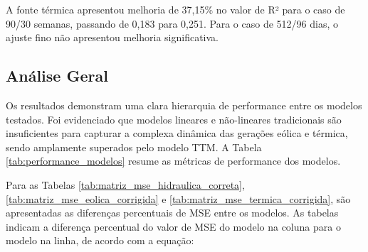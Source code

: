 A fonte térmica apresentou melhoria de 37,15\% no valor de R² para o caso de 90/30 semanas, passando de 0,183 para 0,251.
Para o caso de 512/96 dias, o ajuste fino não apresentou melhoria significativa. 

\subsection{Análise Geral}
Os resultados demonstram uma clara hierarquia de performance entre os modelos testados. Foi evidenciado que modelos 
lineares e não-lineares tradicionais são insuficientes para capturar a complexa dinâmica das gerações eólica e térmica, sendo 
amplamente superados pelo modelo TTM. A Tabela \ref{tab:performance_modelos} resume as métricas de performance dos modelos.

\begin{table}[htb]
  \centering
\end{table}

Para as Tabelas \ref{tab:matriz_mse_hidraulica_correta}, \ref{tab:matriz_mse_eolica_corrigida} e \ref{tab:matriz_mse_termica_corrigida},
são apresentadas as diferenças percentuais de MSE entre os modelos. As tabelas indicam a diferença percentual do valor de
MSE do modelo na coluna para o modelo na linha, de acordo com a equação:

